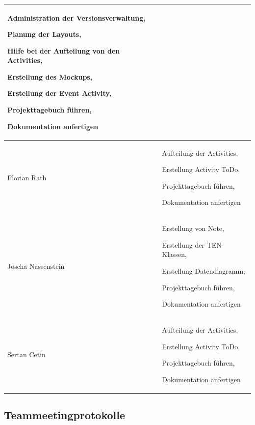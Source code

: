 \begin{longtable}{|p{4cm}|p{10cm}|}
Administration der Versionsverwaltung,

Planung der Layouts,

Hilfe bei der Aufteilung von den Activities,

Erstellung des Mockups, 

Erstellung der Event Activity, 

Projekttagebuch führen, 

Dokumentation anfertigen \\ \hline
Florian Rath  & Aufteilung der Activities, 

Erstellung Activity ToDo, 

Projekttagebuch führen, 

Dokumentation anfertigen \\ \hline
Joscha Nassenstein & Erstellung von Note, 

Erstellung der TEN-Klassen,  

Erstellung Datendiagramm, 

Projekttagebuch führen, 

Dokumentation anfertigen \\ \hline
Sertan Cetin &  Aufteilung der Activities, 

Erstellung Activity ToDo, 

Projekttagebuch führen, 

Dokumentation anfertigen \\ \hline
\end{longtable}

\newpage
\subsection{Teammeetingprotokolle}

